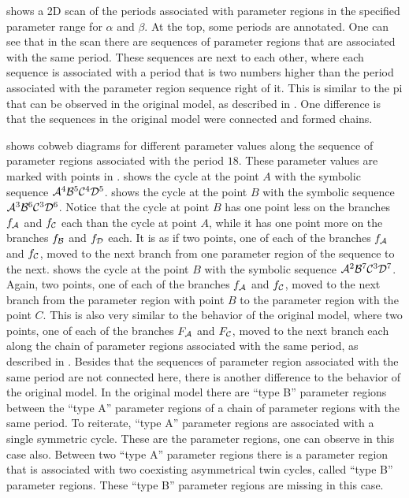  shows a 2D scan of the periods associated with parameter regions in the specified parameter range for $\alpha$ and $\beta$.
At the top, some periods are annotated.
One can see that in the scan there are sequences of parameter regions that are associated with the same period.
These sequences are next to each other, where each sequence is associated with a period that is two numbers higher than the period associated with the parameter region sequence right of it.
This is similar to the \gls{pi} that can be observed in the original model, as described in .
One difference is that the sequences in the original model were connected and formed chains.

 shows cobweb diagrams for different parameter values along the sequence of parameter regions associated with the period $18$.
These parameter values are marked with points in .
 shows the cycle at the point $A$ with the symbolic sequence $\mathcal{A}^4\mathcal{B}^5\mathcal{C}^4\mathcal{D}^5$.
 shows the cycle at the point $B$ with the symbolic sequence $\mathcal{A}^3\mathcal{B}^6\mathcal{C}^3\mathcal{D}^6$.
Notice that the cycle at point $B$ has one point less on the branches $f_{\mathcal{A}}$ and $f_{\mathcal{C}}$ each than the cycle at point $A$, while it has one point more on the branches $f_{\mathcal{B}}$ and $f_{\mathcal{D}}$ each.
It is as if two points, one of each of the branches $f_{\mathcal{A}}$ and $f_{\mathcal{C}}$, moved to the next branch from one parameter region of the sequence to the next.
 shows the cycle at the point $B$ with the symbolic sequence $\mathcal{A}^2\mathcal{B}^7\mathcal{C}^3\mathcal{D}^7$.
Again, two points, one of each of the branches $f_{\mathcal{A}}$ and $f_{\mathcal{C}}$, moved to the next branch from the parameter region with point $B$ to the parameter region with the point $C$.
This is also very similar to the behavior of the original model, where two points, one of each of the branches $F_{\mathcal{A}}$ and $F_{\mathcal{C}}$, moved to the next branch each along the chain of parameter regions associated with the same period, as described in .
Besides that the sequences of parameter region associated with the same period are not connected here, there is another difference to the behavior of the original model.
In the original model there are ``type B'' parameter regions between the ``type A'' parameter regions of a chain of parameter regions with the same period.
To reiterate, ``type A'' parameter regions are associated with a single symmetric cycle.
These are the parameter regions, one can observe in this case also.
Between two ``type A'' parameter regions there is a parameter region that is associated with two coexisting asymmetrical twin cycles, called ``type B'' parameter regions.
These ``type B'' parameter regions are missing in this case.
